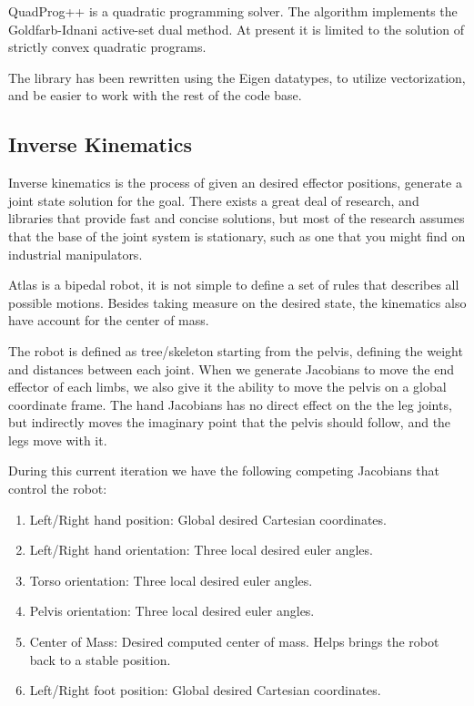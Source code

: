 \documentclass[12pt]{report}
\begin{document}
QuadProg++ is a quadratic programming solver. The algorithm implements the Goldfarb-Idnani active-set dual method. At present it is limited to the solution of strictly convex quadratic programs. \cite{quadprog}

The library has been rewritten using the Eigen datatypes, to utilize vectorization, and be easier to work with the rest of the code base. 

\subsection{Inverse Kinematics}


Inverse kinematics is the process of given an desired effector positions, generate a joint state solution for the goal. There exists a great deal of research, and libraries that provide fast and concise solutions, but most of the research assumes that the base of the joint system is stationary, such as one that you might find on industrial manipulators. 

Atlas is a bipedal robot, it is not simple to define a set of rules that describes all possible motions. Besides taking measure on the desired state, the kinematics also have account for the center of mass.

The robot is defined as tree/skeleton starting from the pelvis, defining the weight and distances between each joint. When we generate Jacobians \cite{robot_modeling} to move the end effector of each limbs, we also give it the ability to move the pelvis on a global coordinate frame. The hand Jacobians has no direct effect on the the leg joints, but indirectly moves the imaginary point that the pelvis should follow, and the legs move with it. 

During this current iteration we have the following competing Jacobians that control the robot: 
\begin{enumerate}
\item Left/Right hand position: Global desired Cartesian coordinates.
\item Left/Right hand orientation: Three local desired euler angles.
\item Torso orientation: Three local desired euler angles.
\item Pelvis orientation: Three local desired euler angles.
\item Center of Mass: Desired computed center of mass. Helps brings the robot back to a stable position.
\item Left/Right foot position: Global desired Cartesian coordinates.
\end{enumerate}
\end{document}
